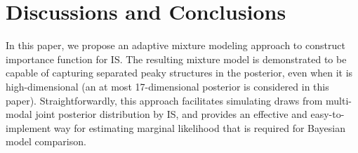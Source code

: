 \section{Discussions and Conclusions} \label{sec:disc}
In this paper, we propose an adaptive mixture modeling approach to
construct importance function for IS. The resulting mixture model is
demonstrated to be capable of capturing separated peaky structures
in the posterior, even when it is high-dimensional (an at most
17-dimensional posterior is considered in this paper).
Straightforwardly, this approach facilitates simulating draws from
multi-modal joint posterior distribution by IS, and provides an
effective and easy-to-implement way for estimating marginal
likelihood that is required for Bayesian model comparison.